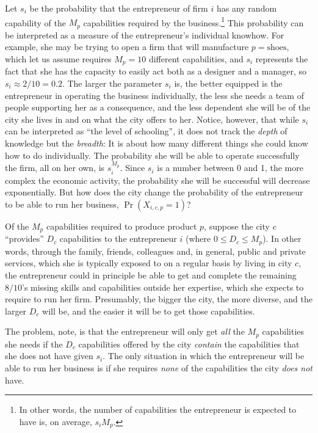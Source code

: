 \documentclass[12pt]{article}
\begin{document}
Let $s_i$ be the probability that the entrepreneur of firm $i$ has any random capability of the $M_p$ capabilities required by the business.\footnote{In other words, the number of capabilities the entrepreneur is expected to have is, on average, $s_i M_p$.} This probability can be interpreted as a measure of the entrepreneur's individual knowhow. For example, she may be trying to open a firm that will manufacture $p=\text{shoes}$, which let us assume requires $M_p=10$ different capabilities, and $s_i$ represents the fact that she has the capacity to easily act both as a designer and a manager, so $s_i\approx 2/10=0.2$. The larger the parameter $s_i$ is, the better equipped is the entrepreneur in operating the business individually, the less she needs a team of people supporting her as a consequence, and the less dependent she will be of the city she lives in and on what the city offers to her. Notice, however, that while $s_i$ can be interpreted as ``the level of schooling'', it does not track the \emph{depth} of knowledge but the \emph{breadth}: It is about how many different things she could know how to do individually. The probability she will be able to operate successfully the firm, all on her own, is $s_i^{M_p}$. Since $s_i$ is a number between 0 and 1, the more complex the economic activity, the probability she will be successful will decrease exponentially. But how does the city change the probability of the entrepreneur to be able to run her business, $\Pr(X_{i,c,p}=1)$?

Of the $M_p$ capabilities required to produce product $p$, suppose the city $c$ ``provides'' $D_c$ capabilities to the entrepreneur $i$ (where $0\leq D_c\leq M_p$). In other words, through the family, friends, colleagues and, in general, public and private services, which she is typically exposed to on a regular basis by living in city $c$, the entrepreneur could in principle be able to get and complete the remaining $8/10$'s missing skills and capabilities outside her expertise, which she expects to require to run her firm. Presumably, the bigger the city, the more diverse, and the larger $D_c$ will be, and the easier it will be to get those capabilities. 

The problem, note, is that the entrepreneur will only get \emph{all} the $M_p$ capabilities she needs if the $D_c$ capabilities offered by the city \emph{contain} the capabilities that she does not have given $s_i$. The only situation in which the entrepreneur will be able to run her business is if she requires \emph{none} of the capabilities the city \emph{does not} have. 
\end{document}
